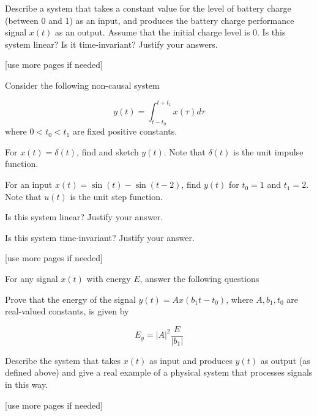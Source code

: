 \documentclass{ee102_pset}
\begin{document}
\problempart Describe a system that takes a constant value for the level of battery charge (between 0 and 1) as an input, and produces the battery charge performance signal $x(t)$ as an output. Assume that the initial charge level is 0. Is this system linear? Is it time-invariant? Justify your answers.

\vspace*{\fill}
\begin{center}
[use more pages if needed]
\end{center}

Consider the following non-causal system 

\[
y(t) = \int_{t-t_0}^{t+t_1} x(\tau) d\tau
\]
where $0 < t_0 < t_1$ are fixed positive constants.

\problempart For $x(t) = \delta(t)$, find and sketch $y(t)$. Note that $\delta(t)$ is the unit impulse function.

\problempart For an input $x(t) = \sin(t) - \sin(t-2)$, find $y(t)$ for $t_0 = 1$ and $t_1 = 2$. Note that $u(t)$ is the unit step function.

\problempart Is this system linear? Justify your answer.

\problempart Is this system time-invariant? Justify your answer.

\vspace*{\fill}
\begin{center}
[use more pages if needed]
\end{center}
 For any signal $x(t)$ with energy $E$, answer the following questions

\problempart Prove that the energy of the signal $y(t) = A x(b_1 t - t_0)$, where $A, b_1, t_0$ are real-valued constants, is given by 

\[
E_y = |A|^2 \frac{E}{|b_1|}
\]

\problempart Describe the system that takes $x(t)$ as input and produces $y(t)$ as output (as defined above) and give a real example of a physical system that processes signals in this way.

\vspace*{\fill}
\begin{center}
[use more pages if needed]
\end{center}
\end{document}
